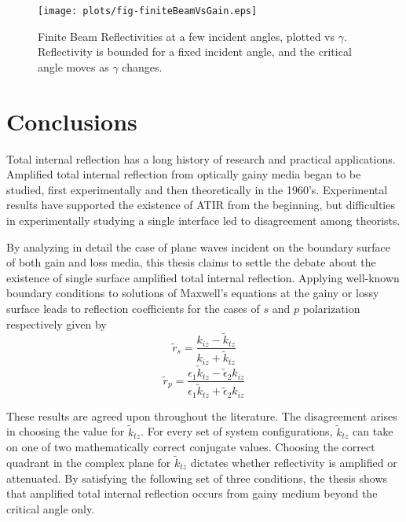\documentclass[12pt]{uthesis-v12}
\begin{document}
\begin{figure}
\centering
\texttt{[image: plots/fig-finiteBeamVsGain.eps]}
\caption[Finite Beam Reflectivities  at a few incident angles, plotted vs $\gamma$]{Finite Beam Reflectivities  at a few incident angles, plotted vs $\gamma$. Reflectivity is bounded for a fixed incident angle, and the critical angle moves as $\gamma$ changes.
 \label{fig-finiteBeamVsGain}}
\end{figure}


\chapter{Conclusions}\label{chap-conclusions}
Total internal reflection has a long history of research and practical applications. Amplified total internal reflection from optically gainy media began to be studied, first experimentally and then theoretically in the 1960's. Experimental results have supported the existence of ATIR from the beginning, but difficulties in experimentally studying a single interface led to disagreement among theorists.

By analyzing in detail the case of plane waves incident on the boundary surface of both gain and loss media, this thesis claims to settle the debate about the existence of single surface amplified total internal reflection. Applying well-known boundary conditions to solutions of Maxwell's equations at the gainy or lossy surface leads to reflection coefficients for the cases of $s$ and $p$ polarization respectively given by
\begin{equation}
\tilde{r}_s=\frac{k_{iz}-\tilde{k}_{tz}}{k_{iz}+\tilde{k}_{tz}}
\end{equation}
\begin{equation}
\tilde{r}_p=\frac{\epsilon_1\tilde{k}_{tz}-\tilde{\epsilon}_2k_{iz}}{\epsilon_1\tilde{k}_{tz}+\tilde{\epsilon}_2k_{iz}}
\end{equation}

These results are agreed upon throughout the literature. The disagreement arises in choosing the value for $\tilde{k}_{tz}$. For every set of system configurations, $\tilde{k}_{tz}$ can take on one of two mathematically correct conjugate values.  Choosing the correct quadrant in the complex plane for $\tilde{k}_{tz}$ dictates whether reflectivity is amplified or attenuated.  By satisfying the following set of three conditions, the thesis shows that amplified total internal reflection occurs from gainy medium beyond the critical angle only.
\end{document}
